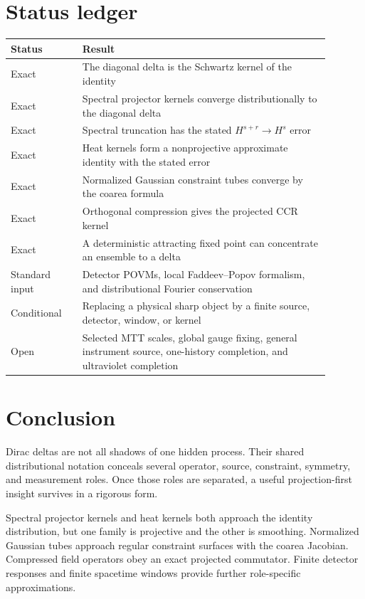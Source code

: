 \documentclass[11pt]{article}
\begin{document}
\section{Status ledger}

\begin{center}
\begin{tabular}{p{0.20\linewidth}p{0.69\linewidth}}
\toprule
Status & Result\\
\midrule
Exact &
The diagonal delta is the Schwartz kernel of the identity\\
Exact &
Spectral projector kernels converge distributionally to the diagonal delta\\
Exact &
Spectral truncation has the stated \(H^{s+r}\to H^s\) error\\
Exact &
Heat kernels form a nonprojective approximate identity with the stated error\\
Exact &
Normalized Gaussian constraint tubes converge by the coarea formula\\
Exact &
Orthogonal compression gives the projected CCR kernel\\
Exact &
A deterministic attracting fixed point can concentrate an ensemble to a
delta\\
Standard input &
Detector POVMs, local Faddeev--Popov formalism, and distributional Fourier
conservation\\
Conditional &
Replacing a physical sharp object by a finite source, detector, window, or
kernel\\
Open &
Selected MTT scales, global gauge fixing, general instrument source,
one-history completion, and ultraviolet completion\\
\bottomrule
\end{tabular}
\end{center}

\section{Conclusion}

Dirac deltas are not all shadows of one hidden process. Their shared
distributional notation conceals several operator, source, constraint,
symmetry, and measurement roles. Once those roles are separated, a useful
projection-first insight survives in a rigorous form.

Spectral projector kernels and heat kernels both approach the identity
distribution, but one family is projective and the other is smoothing.
Normalized Gaussian tubes approach regular constraint surfaces with the
coarea Jacobian. Compressed field operators obey an exact projected
commutator. Finite detector responses and finite spacetime windows provide
further role-specific approximations.
\end{document}
